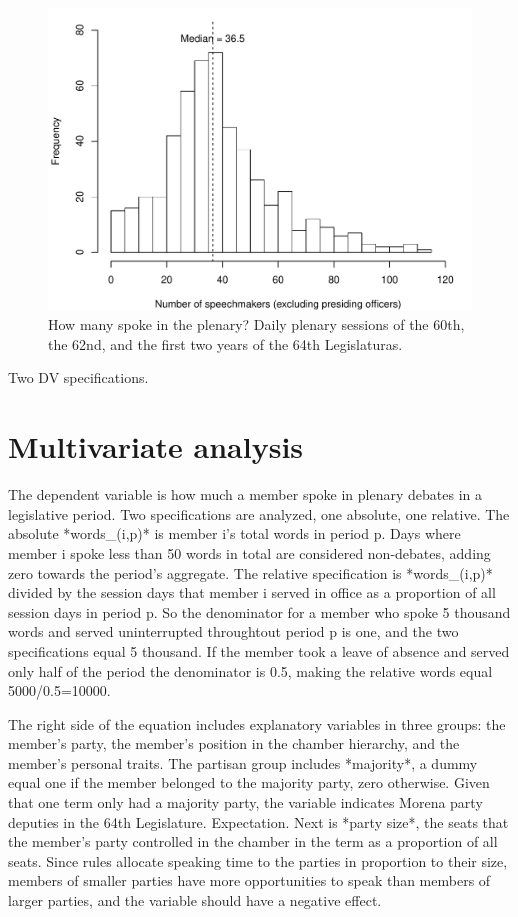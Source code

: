 \documentclass[letter,12pt]{article}
\begin{document}
\begin{figure}
  \centering
    \includegraphics[width=.8\columnwidth]{../plots/nspeakers.pdf}
    \caption{How many spoke in the plenary? Daily plenary sessions of the 60th, the 62nd, and the first two years of the 64th Legislaturas.}\label{F:nspeakers}
\end{figure}





Two DV specifications. 


\section{Multivariate analysis}

The dependent variable is how much a member spoke in plenary debates in a legislative period. Two specifications are analyzed, one absolute, one relative. The absolute *words_(i,p)* is member i's total words in period p. Days where member i spoke less than 50 words in total are considered non-debates, adding zero towards the period's aggregate. The relative specification is *words_(i,p)* divided by the session days that member i served in office as a proportion of all session days in period p. So the denominator for a member who spoke 5 thousand words and served uninterrupted throughtout period p is one, and the two specifications equal 5 thousand. If the member took a leave of absence and served only half of the period the denominator is 0.5, making the relative words equal 5000/0.5=10000.  

The right side of the equation includes explanatory variables in three groups: the member's party, the member's position in the chamber hierarchy, and the member's personal traits. The partisan group includes *majority*, a dummy equal one if the member belonged to the majority party, zero otherwise. Given that one term only had a majority party, the variable indicates Morena party deputies in the 64th Legislature. Expectation. Next is *party size*, the seats that the member's party controlled in the chamber in the term as a proportion of all seats. Since rules allocate speaking time to the parties in proportion to their size, members of smaller parties have more opportunities to speak than  members of larger parties, and the variable should have a negative effect.
\end{document}
